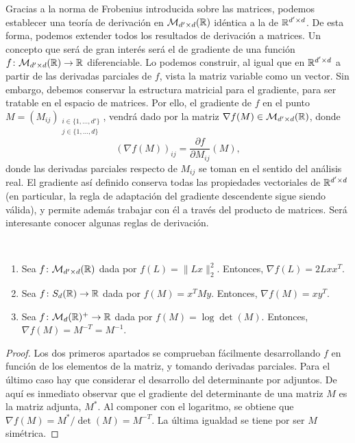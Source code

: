 Gracias a la norma de Frobenius introducida sobre las matrices, podemos establecer una teoría de derivación en $\mathcal{M}_{d' \times d}(\mathbb{R})$ idéntica a la de $\mathbb{R}^{d'\times d}$. De esta forma, podemos extender todos los resultados de derivación a matrices. Un concepto que será de gran interés será el de gradiente de una función $f \colon \mathcal{M}_{d' \times d}(\mathbb{R}) \to \mathbb{R}$ diferenciable. Lo podemos construir, al igual que en $\mathbb{R}^{d'\times d}$ a partir de las derivadas parciales de $f$, vista la matriz variable como un vector. Sin embargo, debemos conservar la estructura matricial para el gradiente, para ser tratable en el espacio de matrices. Por ello, el gradiente de $f$ en el punto $M = (M_{ij})_{\substack{i \in \{1,\dots,d'\}\\j \in \{1,\dots,d\}}}$, vendrá dado por la matriz $\nabla f(M) \in \mathcal{M}_{d'\times d}(\mathbb{R})$, donde
\[ (\nabla f(M))_{ij} = \frac{\partial f}{\partial M_{ij}}(M), \]
donde las derivadas parciales respecto de $M_{ij}$ se toman en el sentido del análisis real. El gradiente así definido conserva todas las propiedades vectoriales de $\mathbb{R}^{d'\times d}$ (en particular, la regla de adaptación del gradiente descendente sigue siendo válida), y permite además trabajar con él a través del producto de matrices. Será interesante conocer algunas reglas de derivación.

\begin{prop}~
    \begin{enumerate}
        \item Sea $f \colon \mathcal{M}_{d' \times d}(\mathbb{R})$ dada por $f(L) = \|Lx\|_2^2$. Entonces, $\nabla f(L) = 2Lxx^T$.
        \item Sea $f \colon S_d(\mathbb{R}) \to \mathbb{R}$ dada por $f(M) = x^TMy$. Entonces, $\nabla f(M) = xy^T$.
        \item Sea $f \colon \mathcal{M}_d(\mathbb{R})^+ \to \mathbb{R}$ dada por $f(M) = \log\det(M)$. Entonces, $\nabla f(M) = M^{-T} = M^{-1}$.
    \end{enumerate}
\end{prop}

\begin{proof}
    Los dos primeros apartados se comprueban fácilmente desarrollando $f$ en función de los elementos de la matriz, y tomando derivadas parciales. Para el último caso hay que considerar el desarrollo del determinante por adjuntos. De aquí es inmediato observar que el gradiente del determinante de una matriz $M$ es la matriz adjunta, $M^*$. Al componer con el logaritmo, se obtiene que $\nabla f(M) = M^*/\det(M) = M^{-T}$. La última igualdad se tiene por ser $M$ simétrica.
\end{proof}
